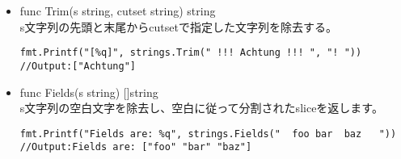 \begin{itemize}
\begin{lstlisting}[numbers=none]
fmt.Printf("%q\n", strings.Split("a,b,c", ","))
fmt.Printf("%q\n", strings.Split("a man a plan a canal panama", "a "))
fmt.Printf("%q\n", strings.Split(" xyz ", ""))
fmt.Printf("%q\n", strings.Split("", "Bernardo O'Higgins"))
//Output:["a" "b" "c"]
//["" "man " "plan " "canal panama"]
//[" " "x" "y" "z" " "]
//[""]
\end{lstlisting}
\item func Trim(s string, cutset string) string\\ s文字列の先頭と末尾からcutsetで指定した文字列を除去する。
\begin{lstlisting}[numbers=none]
fmt.Printf("[%q]", strings.Trim(" !!! Achtung !!! ", "! "))
//Output:["Achtung"]
\end{lstlisting}
\item func Fields(s string) []string\\ s文字列の空白文字を除去し、空白に従って分割されたsliceを返します。
\begin{lstlisting}[numbers=none]
fmt.Printf("Fields are: %q", strings.Fields("  foo bar  baz   "))
//Output:Fields are: ["foo" "bar" "baz"]
\end{lstlisting}
\end{itemize}
